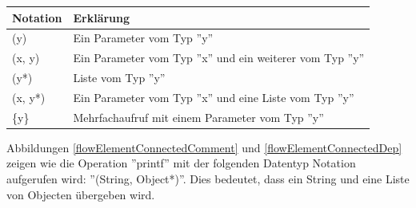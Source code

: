\begin{center}
\begin{tabular}{|l|l|}
	\hline
	Notation & Erklärung \\
	\hline
	(y) & Ein Parameter vom Typ ''y'' \\
	\hline
	(x, y) & Ein Parameter vom Typ ''x'' und ein weiterer vom Typ ''y'' \\
	\hline
	(y*) & Liste vom Typ ''y'' \\
	\hline
	(x, y*) & Ein Parameter vom Typ ''x'' und eine Liste vom Typ ''y'' \\
	\hline
	\{y\} & Mehrfachaufruf mit einem Parameter vom Typ ''y'' \\
	\hline
\end{tabular}
\end{center}

Abbildungen \ref{flowElementConnectedComment} und \ref{flowElementConnectedDep} zeigen wie die Operation ''printf'' mit
der folgenden Datentyp Notation aufgerufen wird: ''(String, Object*)''. Dies bedeutet, dass ein String und eine Liste
von Objecten übergeben wird.